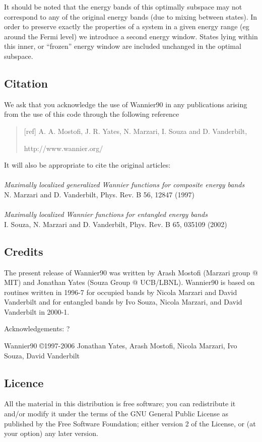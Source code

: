 It should be noted that the energy bands of this
optimally subspace may not correspond to any of the original energy
bands (due to mixing between states). In order to preserve exactly the
properties of a system in a given energy range (eg around the Fermi
level) we introduce a second  energy window. States lying
within this inner, or ``frozen'' energy window are included unchanged
in the optimal subspace.

\subsection{Citation}
We ask that you acknowledge the use of Wannier90 in any publications
arising from the use of this code through the following reference
\begin{quote}
[ref] A. A. Mostofi, J. R. Yates,
N. Marzari, I. Souza and D. Vanderbilt,  

 http://www.wannier.org/                 
\end{quote}                                                              

It will also be appropriate to cite the original articles:\\\\
{\it Maximally localized generalized Wannier functions for composite energy bands}\\
N. Marzari and D. Vanderbilt, Phys. Rev. B 56, 12847 (1997)\\\\
{\it Maximally localized Wannier functions for entangled energy bands}\\
I. Souza, N. Marzari and D. Vanderbilt, Phys. Rev. B 65, 035109 (2002)


\subsection{Credits}
The present release of Wannier90 was written by Arash Mostofi (Marzari
group @ MIT) and Jonathan Yates (Souza Group @ UCB/LBNL). Wannier90 is
based on routines written in 1996-7 for occupied bands by Nicola Marzari
and David Vanderbilt and for entangled bands by Ivo Souza, Nicola Marzari,
and David Vanderbilt in 2000-1. 

Acknowledgements: ?

Wannier90 \copyright 1997-2006 Jonathan Yates, Arash
Mostofi, Nicola Marzari, Ivo Souza, David Vanderbilt      

\subsection{Licence}
All the material in this distribution is free software; you can
redistribute it and/or 
modify it under the terms of the GNU General Public License
as published by the Free Software Foundation; either version 2
of the License, or (at your option) any later version.

